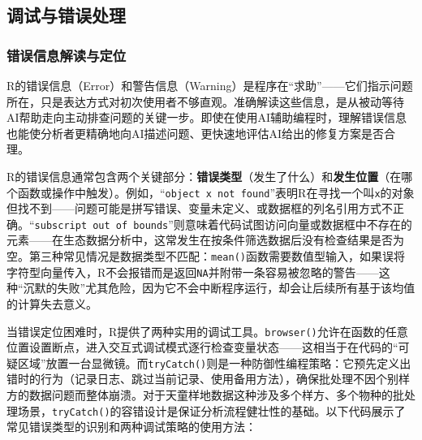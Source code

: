 \documentclass[
  twoside,12pt,fontset=none]{ctexbook}
\begin{document}
\hypertarget{ux8c03ux8bd5ux4e0eux9519ux8befux5904ux7406}{%
\subsection{调试与错误处理}\label{ux8c03ux8bd5ux4e0eux9519ux8befux5904ux7406}}

\hypertarget{ux9519ux8befux4fe1ux606fux89e3ux8bfbux4e0eux5b9aux4f4d}{%
\subsubsection{错误信息解读与定位}\label{ux9519ux8befux4fe1ux606fux89e3ux8bfbux4e0eux5b9aux4f4d}}

R的错误信息（Error）和警告信息（Warning）是程序在``求助''------它们指示问题所在，只是表达方式对初次使用者不够直观。准确解读这些信息，是从被动等待AI帮助走向主动排查问题的关键一步。即使在使用AI辅助编程时，理解错误信息也能使分析者更精确地向AI描述问题、更快速地评估AI给出的修复方案是否合理。

R的错误信息通常包含两个关键部分：\textbf{错误类型}（发生了什么）和\textbf{发生位置}（在哪个函数或操作中触发）。例如，``\texttt{object\ \textquotesingle{}x\textquotesingle{}\ not\ found}''表明R在寻找一个叫\texttt{x}的对象但找不到------问题可能是拼写错误、变量未定义、或数据框的列名引用方式不正确。``\texttt{subscript\ out\ of\ bounds}''则意味着代码试图访问向量或数据框中不存在的元素------在生态数据分析中，这常发生在按条件筛选数据后没有检查结果是否为空。第三种常见情况是数据类型不匹配：\texttt{mean()}函数需要数值型输入，如果误将字符型向量传入，R不会报错而是返回\texttt{NA}并附带一条容易被忽略的警告------这种``沉默的失败''尤其危险，因为它不会中断程序运行，却会让后续所有基于该均值的计算失去意义。

当错误定位困难时，R提供了两种实用的调试工具。\texttt{browser()}允许在函数的任意位置设置断点，进入交互式调试模式逐行检查变量状态------这相当于在代码的``可疑区域''放置一台显微镜。而\texttt{tryCatch()}则是一种防御性编程策略：它预先定义出错时的行为（记录日志、跳过当前记录、使用备用方法），确保批处理不因个别样方的数据问题而整体崩溃。对于天童样地数据这种涉及多个样方、多个物种的批处理场景，\texttt{tryCatch()}的容错设计是保证分析流程健壮性的基础。以下代码展示了常见错误类型的识别和两种调试策略的使用方法：
\end{document}
